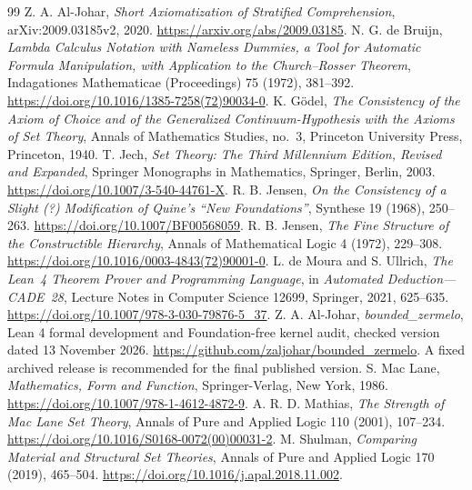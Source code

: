 \documentclass[11pt,a4paper]{article}
\numberwithin{equation}{section}
\begin{document}
\small
\begin{thebibliography}{99}
Z. A. Al-Johar, \emph{Short Axiomatization of Stratified Comprehension}, arXiv:2009.03185v2, 2020. \url{https://arxiv.org/abs/2009.03185}.
N. G. de Bruijn, \emph{Lambda Calculus Notation with Nameless Dummies, a Tool for Automatic Formula Manipulation, with Application to the Church--Rosser Theorem}, Indagationes Mathematicae (Proceedings) 75 (1972), 381--392. \url{https://doi.org/10.1016/1385-7258(72)90034-0}.
K. G\"odel, \emph{The Consistency of the Axiom of Choice and of the Generalized Continuum-Hypothesis with the Axioms of Set Theory}, Annals of Mathematics Studies, no.~3, Princeton University Press, Princeton, 1940.
T. Jech, \emph{Set Theory: The Third Millennium Edition, Revised and Expanded}, Springer Monographs in Mathematics, Springer, Berlin, 2003. \url{https://doi.org/10.1007/3-540-44761-X}.
R. B. Jensen, \emph{On the Consistency of a Slight (?) Modification of Quine's ``New Foundations''}, Synthese 19 (1968), 250--263. \url{https://doi.org/10.1007/BF00568059}.
R. B. Jensen, \emph{The Fine Structure of the Constructible Hierarchy}, Annals of Mathematical Logic 4 (1972), 229--308. \url{https://doi.org/10.1016/0003-4843(72)90001-0}.
L. de Moura and S. Ullrich, \emph{The Lean~4 Theorem Prover and Programming Language}, in \emph{Automated Deduction---CADE~28}, Lecture Notes in Computer Science 12699, Springer, 2021, 625--635. \url{https://doi.org/10.1007/978-3-030-79876-5_37}.
Z. A. Al-Johar, \emph{bounded\_zermelo}, Lean 4 formal development and Foundation-free kernel audit, checked version dated 13 November 2026. \url{https://github.com/zaljohar/bounded_zermelo}.  A fixed archived release is recommended for the final published version.
S. Mac Lane, \emph{Mathematics, Form and Function}, Springer-Verlag, New York, 1986. \url{https://doi.org/10.1007/978-1-4612-4872-9}.
A. R. D. Mathias, \emph{The Strength of Mac Lane Set Theory}, Annals of Pure and Applied Logic 110 (2001), 107--234. \url{https://doi.org/10.1016/S0168-0072(00)00031-2}.
M. Shulman, \emph{Comparing Material and Structural Set Theories}, Annals of Pure and Applied Logic 170 (2019), 465--504. \url{https://doi.org/10.1016/j.apal.2018.11.002}.
\end{thebibliography}
\end{document}
